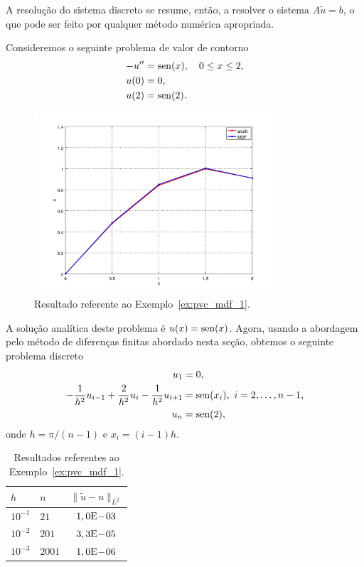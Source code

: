 A resolução do sistema discreto se resume, então, a resolver o sistema $A\tilde{u} = b$, o que pode ser feito por qualquer método numérica apropriada.


\begin{ex}\label{ex:pvc_mdf_1}
  Consideremos o seguinte problema de valor de contorno
  \begin{align}
    -u'' &= \operatorname{sen}(x),\quad 0\leq x \leq 2,\\
    u(0) &= 0,\\
    u(2) &= \operatorname{sen}(2).
  \end{align}

\begin{figure}[h!]
  \centering
  \includegraphics[width=0.8\textwidth]{./cap_pvc/dados/ex_pvc_mdf_1/ex_pvc_mdf_1}
  \caption{Resultado referente ao Exemplo~\ref{ex:pvc_mdf_1}.}
  \label{fig:ex_pvc_mdf_1}
\end{figure}

A solução analítica deste problema é $u(x) = \operatorname{sen}(x)$. Agora, usando a abordagem pelo método de diferenças finitas abordado nesta seção, obtemos o seguinte problema discreto
\begin{align}
  u_1 &= 0,\\
  -\frac{1}{h^2}u_{i-1} + \frac{2}{h^2}u_i - \frac{1}{h^2}u_{i+1} &= \operatorname{sen}(x_i),~i=2, \dotsc, n-1,\\
  u_n &= \operatorname{sen}(2),
\end{align}
onde $h=\pi/(n-1)$ e $x_i = (i-1)h$.

\begin{table}[h!]
  \centering
  \begin{tabular}{ll|c}
    $h$ & $n$ & $\|\tilde{u} - u\|_{L^2}$ \\\hline
    $10^{-1}$ & $21$ & $1,0\mathrm{E}\!-\!03$ \\
    $10^{-2}$ & $201$ & $3,3\mathrm{E}\!-\!05$ \\
    $10^{-3}$ & $2001$ & $1,0\mathrm{E}\!-\!06$ \\\hline
  \end{tabular}
  \caption{Resultados referentes ao Exemplo~\ref{ex:pvc_mdf_1}.}
  \label{tab:ex_pvc_mdf_1}
\end{table}


\end{ex}
